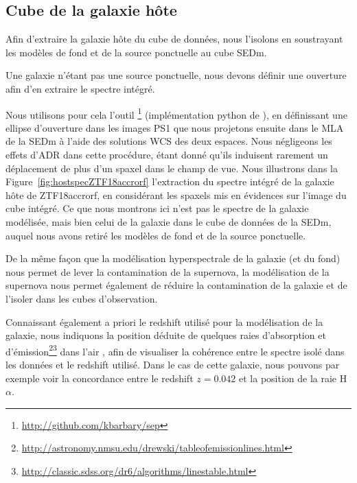 \documentclass[../main/main.tex]{subfiles}
\begin{document}
\subsection{Cube de la galaxie hôte}\label{ssec:hostextract}

Afin d'extraire la galaxie hôte du cube de données, nous l'isolons en
soustrayant les modèles de fond et de la source ponctuelle au cube SEDm.

Une galaxie n'étant pas une source ponctuelle, nous devons
définir une ouverture afin d'en extraire le spectre intégré.

Nous utilisons pour cela l'outil \footnote{\url{http://github.com/kbarbary/sep}}
\citep{Barbary2016Sep} (implémentation python de 
\cite{Bertinsextractor}), en définissant une ellipse d'ouverture dans
les images PS1 que nous
projetons ensuite dans le MLA de la SEDm à l'aide des
solutions WCS des deux espaces. Nous négligeons
les effets d'ADR dans cette procédure, étant donné qu'ils induisent rarement un déplacement de plus d'un
spaxel dans le champ de vue. Nous illustrons dans la
Figure~\ref{fig:hostspecZTF18accrorf} l'extraction du spectre intégré de la
galaxie hôte de ZTF18accrorf, en considérant les spaxels mis en
évidences sur l'image du cube intégré. Ce que nous montrons ici n'est
pas le spectre de la galaxie modélisée, mais bien celui de la galaxie
dans le cube de données de la SEDm, auquel nous avons retiré les modèles
de fond et de la source ponctuelle.

De la même façon que la modélisation
hyperspectrale de la galaxie (et du fond) nous permet de lever la
contamination de la supernova, la modélisation de la supernova nous
permet également de réduire la contamination de la galaxie et de
l'isoler dans les cubes d'observation.

Connaissant également a priori le redshift utilisé pour la modélisation
de la galaxie, nous indiquons la position déduite de quelques raies
d'absorption et
d'émission\footnote{\url{http://astronomy.nmsu.edu/drewski/tableofemissionlines.html}}\footnote{\url{http://classic.sdss.org/dr6/algorithms/linestable.html}}
dans l'air \citep{Morton1991}, afin de visualiser la cohérence entre le
spectre isolé dans les données et le redshift utilisé. Dans le cas de
cette galaxie, nous pouvons par exemple voir la concordance entre le redshift
$z=0.042$ et la position de la raie H$\alpha$.
\end{document}
